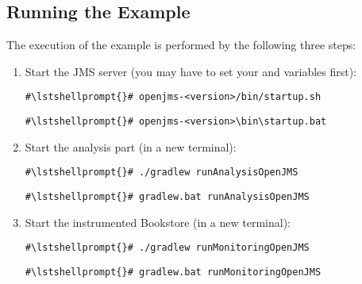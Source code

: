 \setPropertiesListing


\subsection{Running the Example}

 The execution of the example is performed by the following three steps:
\begin{enumerate}
\item Start the JMS server (you may have to set your  and  variables first):

\setBashListing
\begin{lstlisting}[caption=Start of the JMS server under UNIX-like systems]
#\lstshellprompt{}# openjms-<version>/bin/startup.sh
\end{lstlisting}
\begin{lstlisting}[caption=Start of the JMS server under Windows]
#\lstshellprompt{}# openjms-<version>\bin\startup.bat
\end{lstlisting}
\item Start the analysis part (in a new terminal):
\setBashListing
\begin{lstlisting}[caption=Start of the JMS server under UNIX-like systems]
#\lstshellprompt{}# ./gradlew runAnalysisOpenJMS
\end{lstlisting}
\begin{lstlisting}[caption=Start of the JMS server under Windows]
#\lstshellprompt{}# gradlew.bat runAnalysisOpenJMS
\end{lstlisting}
\item Start the instrumented Bookstore (in a new terminal):
\setBashListing
\begin{lstlisting}[caption=Start of the JMS server under UNIX-like systems]
#\lstshellprompt{}# ./gradlew runMonitoringOpenJMS
\end{lstlisting}
\begin{lstlisting}[caption=Start of the JMS server under Windows]
#\lstshellprompt{}# gradlew.bat runMonitoringOpenJMS
\end{lstlisting}
\end{enumerate}
